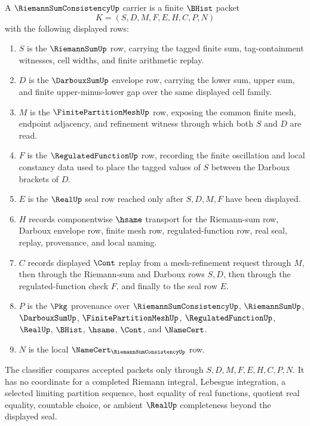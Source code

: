 \begin{definition}
\label{def:riemann-sum-consistency-carrier}
A $\RiemannSumConsistencyUp$ carrier is a finite $\BHist$ packet
$$
K=(S,D,M,F,E,H,C,P,N)
$$
with the following displayed rows:
\begin{enumerate}
\item $S$ is the $\RiemannSumUp$ row, carrying the tagged finite sum, tag-containment witnesses, cell widths, and finite arithmetic replay.
\item $D$ is the $\DarbouxSumUp$ envelope row, carrying the lower sum, upper sum, and finite upper-minus-lower gap over the same displayed cell family.
\item $M$ is the $\FinitePartitionMeshUp$ row, exposing the common finite mesh, endpoint adjacency, and refinement witness through which both $S$ and $D$ are read.
\item $F$ is the $\RegulatedFunctionUp$ row, recording the finite oscillation and local constancy data used to place the tagged values of $S$ between the Darboux brackets of $D$.
\item $E$ is the $\RealUp$ seal row reached only after $S,D,M,F$ have been displayed.
\item $H$ records componentwise $\hsame$ transport for the Riemann-sum row, Darboux envelope row, finite mesh row, regulated-function row, real seal, replay, provenance, and local naming.
\item $C$ records displayed $\Cont$ replay from a mesh-refinement request through $M$, then through the Riemann-sum and Darboux rows $S,D$, then through the regulated-function check $F$, and finally to the seal row $E$.
\item $P$ is the $\Pkg$ provenance over $\RiemannSumConsistencyUp$, $\RiemannSumUp$, $\DarbouxSumUp$, $\FinitePartitionMeshUp$, $\RegulatedFunctionUp$, $\RealUp$, $\BHist$, $\hsame$, $\Cont$, and $\NameCert$.
\item $N$ is the local $\NameCert_{\RiemannSumConsistencyUp}$ row.
\end{enumerate}
The classifier compares accepted packets only through $S,D,M,F,E,H,C,P,N$. It has no coordinate for a completed Riemann integral, Lebesgue integration, a selected limiting partition sequence, host equality of real functions, quotient real equality, countable choice, or ambient $\RealUp$ completeness beyond the displayed seal.
\end{definition}

